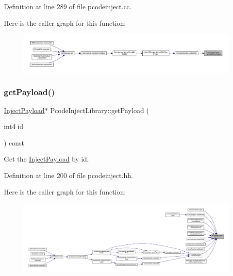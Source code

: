 Definition at line 289 of file pcodeinject.\+cc.

Here is the caller graph for this function\+:
\nopagebreak
\begin{figure}[H]
\begin{center}
\leavevmode
\includegraphics[width=350pt]{class_pcode_inject_library_a928588313e2dfb9454b65f932985d97c_icgraph}
\end{center}
\end{figure}
\mbox{\label{class_pcode_inject_library_a6075295c64a06ab05e954dc6f18945f9}} 
\subsubsection{\texorpdfstring{getPayload()}{getPayload()}}
{\footnotesize\ttfamily \mbox{\hyperlink{class_inject_payload}{Inject\+Payload}}$\ast$ Pcode\+Inject\+Library\+::get\+Payload (\begin{DoxyParamCaption}\item[{int4}]{id }\end{DoxyParamCaption}) const\hspace{0.3cm}{\ttfamily [inline]}}



Get the \mbox{\hyperlink{class_inject_payload}{Inject\+Payload}} by id. 



Definition at line 200 of file pcodeinject.\+hh.

Here is the caller graph for this function\+:
\nopagebreak
\begin{figure}[H]
\begin{center}
\leavevmode
\includegraphics[width=350pt]{class_pcode_inject_library_a6075295c64a06ab05e954dc6f18945f9_icgraph}
\end{center}
\end{figure}
\mbox{\label{class_pcode_inject_library_ad49624d6aa508e6e75d7c23f9c839c02}} 
